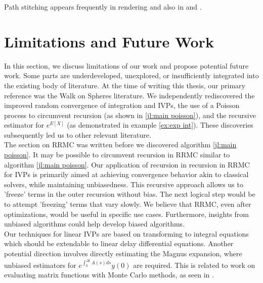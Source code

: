 \documentclass[a4paper,12pt]{article}
\begin{document}
\begin{related}
  Path stitching appears frequently in rendering and also in \cite{das_sarma_fast_2015}
  and \cite{ji_reusing_2012}.
\end{related}



\section{Limitations and Future Work}

In this section, we discuss limitations of our work and propose potential future work.
Some parts are underdeveloped, unexplored, or insufficiently integrated
into the existing body of literature. At the time of writing this thesis, our
primary reference was the Walk on Spheres literature. We independently rediscovered
the improved random convergence of integration and IVPs, the
use of a Poisson process to circumvent recursion (as shown in \ref{jl:main poisson}),
and the recursive estimator for $e^{E[X]}$ (as demonstrated in example \ref{ex:exp int}).
These discoveries subsequently led us to other relevant literature. \\

The section on RRMC was written before we discovered algorithm \ref{jl:main poisson}.
It may be possible to circumvent recursion in RRMC similar to algorithm \ref{jl:main poisson}.
Our application of
recursion in recursion in RRMC for IVPs is primarily aimed at achieving convergence behavior
akin to classical solvers, while maintaining unbiasedness. This recursive approach allows us to
'freeze' terms in the outer recursion without bias. The next logical step would be
to attempt 'freezing' terms that vary slowly. We believe that RRMC, even after optimizations, would
be useful in specific use cases. Furthermore, insights from unbiased algorithms could
help develop biased algorithms. \\

Our techniques for linear IVPs are based on transforming to integral equations which should be extendable
to linear delay differential equations. Another potential direction involves directly estimating
the Magnus expansion, where unbiased estimators for $e^{\int_{0}^{\Delta t} A(s)ds} y(0)$ are required.
This is related to work on evaluating matrix functions with Monte Carlo methods, as seen in \cite{guidotti_fast_2023}. \\
\end{document}
